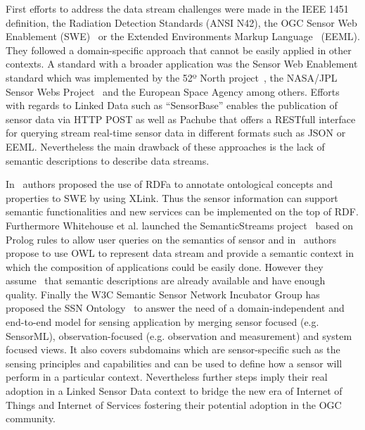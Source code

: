 First efforts to address the data stream challenges were made in the IEEE 1451 
definition, the Radiation Detection Standards (ANSI N42), the OGC Sensor Web 
Enablement (SWE)~\cite{sensorweb-wb,} or the Extended Environments Markup Language~\cite{eeml} (EEML). 
They followed a domain-specific approach that cannot be easily applied in other 
contexts. A standard with a broader application was the Sensor Web Enablement 
standard which was implemented by the 52º North project~\cite{52project}, the NASA/JPL~\cite{nasajpl}
Sensor Webs Project~\cite{Sheth:2008:SSW:1444383.1444435} and the European Space Agency among others. 
Efforts with regards to Linked Data such as ``SensorBase'' enables the publication 
of sensor data via HTTP POST as well as Pachube that offers a RESTfull interface 
for querying stream real-time sensor data in different formats such as JSON or EEML. 
Nevertheless the main drawback of these approaches is the lack of semantic descriptions to describe data streams.


In~\cite{Sheth:2008:SSW:1444383.1444435} authors proposed the use of RDFa to annotate ontological concepts and 
properties to SWE by using XLink. Thus the sensor information can support 
semantic functionalities and new services can be implemented on the top of RDF. 
Furthermore Whitehouse et al. launched the SemanticStreams project~\cite{Whitehouse:2006:SSF:2180141.2180148} based on 
Prolog rules to allow user queries on the semantics of sensor and in~\cite{Bouillet:2007:SMU:1769087.176909} 
authors propose to use OWL to represent data stream and provide a semantic 
context in which the composition of applications could be easily done. However 
they assume~\cite{deri2010} that semantic descriptions are already available and have 
enough quality. Finally the W3C Semantic Sensor Network Incubator Group has 
proposed the SSN Ontology~\cite{Compton:2012:OPS:2400766.2401456} to answer the need of a domain-independent and 
end-to-end model for sensing application by merging sensor focused (e.g. SensorML), observation-focused (e.g. observation and measurement) and system 
focused views. It also covers subdomains which are sensor-specific such as the 
sensing principles and capabilities and can be used to define how a sensor will 
perform in a particular context. Nevertheless further steps imply their real 
adoption in a Linked Sensor Data context to bridge the new era of Internet of 
Things and Internet of Services fostering their potential adoption in the OGC 
community.

